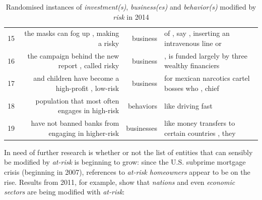 \begin{table}
\begin{tabular}{lrrl}
15 &               the masks can fog up , making a risky  &     business &          of , say , inserting an intravenous line or \\
16 &   the campaign behind the new report , called risky  &     business &      , is funded largely by three wealthy financiers \\
17 &   and children have become a high-profit , low-risk  &     business &      for mexican narcotics cartel bosses who , chief \\
18 &     population that most often engages in high-risk  &    behaviors &                                    like driving fast \\
19 &  have not banned banks from engaging in higher-risk  &   businesses &     like money transfers to certain countries , they \\
\bottomrule
\end{tabular}
\caption[\emph{investment(s)}, \emph{business(es)} and \emph{behavior(s)} modified by \emph{risk} in 2014]{Randomised instances of \emph{investment(s)}, \emph{business(es)} and \emph{behavior(s)} modified by \emph{risk} in 2014}
\label{conc:investbusinessbehavior}
\end{table}

In need of further research is whether or not the list of entities that can sensibly be modified by \emph{at-risk} is beginning to grow: since the U.S. subprime mortgage crisis (beginning in 2007), references to \emph{at-risk homeowners} appear to be on the rise. Results from 2011, for example, show that \emph{nations} and even \emph{economic sectors} are being modified with \emph{at-risk}:

